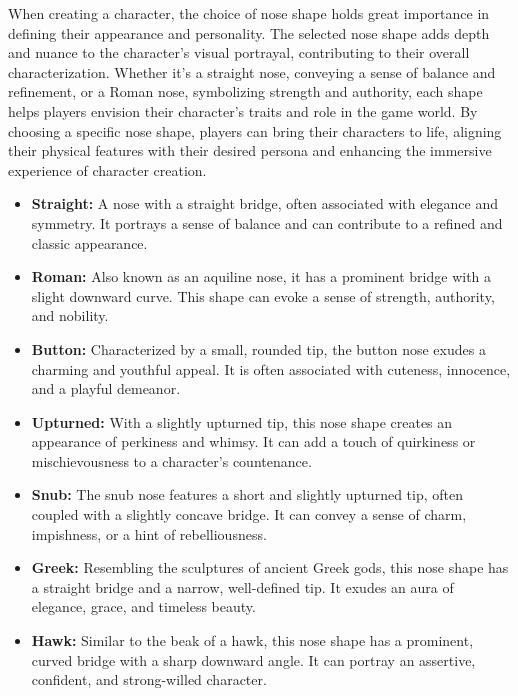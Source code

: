 \documentclass[12pt]{book}  %
\begin{document}
When creating a character, the choice of nose shape holds great importance in defining their appearance and personality. The selected nose shape adds depth and nuance to the character's visual portrayal, contributing to their overall characterization. Whether it's a straight nose, conveying a sense of balance and refinement, or a Roman nose, symbolizing strength and authority, each shape helps players envision their character's traits and role in the game world. By choosing a specific nose shape, players can bring their characters to life, aligning their physical features with their desired persona and enhancing the immersive experience of character creation.

\begin{itemize}
    \item \textbf{Straight:} A nose with a straight bridge, often associated with elegance and symmetry. It portrays a sense of balance and can contribute to a refined and classic appearance.

    \item \textbf{Roman:} Also known as an aquiline nose, it has a prominent bridge with a slight downward curve. This shape can evoke a sense of strength, authority, and nobility.

    \item \textbf{Button:} Characterized by a small, rounded tip, the button nose exudes a charming and youthful appeal. It is often associated with cuteness, innocence, and a playful demeanor.

    \item \textbf{Upturned:} With a slightly upturned tip, this nose shape creates an appearance of perkiness and whimsy. It can add a touch of quirkiness or mischievousness to a character's countenance.

    \item \textbf{Snub:} The snub nose features a short and slightly upturned tip, often coupled with a slightly concave bridge. It can convey a sense of charm, impishness, or a hint of rebelliousness.

    \item \textbf{Greek:} Resembling the sculptures of ancient Greek gods, this nose shape has a straight bridge and a narrow, well-defined tip. It exudes an aura of elegance, grace, and timeless beauty.

    \item \textbf{Hawk:} Similar to the beak of a hawk, this nose shape has a prominent, curved bridge with a sharp downward angle. It can portray an assertive, confident, and strong-willed character.


\end{itemize}
\end{document}
